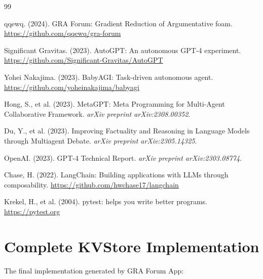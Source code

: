 \documentclass[12pt,a4paper]{article}
\begin{document}

\begin{thebibliography}{99}

qqewq. (2024). GRA Forum: Gradient Reduction of Argumentative foam. \url{https://github.com/qqewq/gra-forum}

Significant Gravitas. (2023). AutoGPT: An autonomous GPT-4 experiment. \url{https://github.com/Significant-Gravitas/AutoGPT}

Yohei Nakajima. (2023). BabyAGI: Task-driven autonomous agent. \url{https://github.com/yoheinakajima/babyagi}

Hong, S., et al. (2023). MetaGPT: Meta Programming for Multi-Agent Collaborative Framework. \textit{arXiv preprint arXiv:2308.00352}.

Du, Y., et al. (2023). Improving Factuality and Reasoning in Language Models through Multiagent Debate. \textit{arXiv preprint arXiv:2305.14325}.

OpenAI. (2023). GPT-4 Technical Report. \textit{arXiv preprint arXiv:2303.08774}.

Chase, H. (2022). LangChain: Building applications with LLMs through composability. \url{https://github.com/hwchase17/langchain}

Krekel, H., et al. (2004). pytest: helps you write better programs. \url{https://pytest.org}

\end{thebibliography}

\appendix
\section{Complete KVStore Implementation}

The final implementation generated by GRA Forum App:
\end{document}
